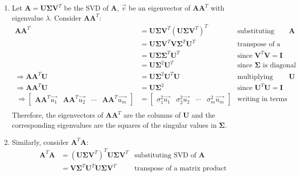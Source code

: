 \documentclass[11pt, fleqn]{article}
\begin{document}
\begin{enumerate}
    \item Let $\textbf{A} = \textbf{U} \boldsymbol{\Sigma} \textbf{V}^T$ be the SVD of $\textbf{A}$, $\vec{v}$ be an eigenvector of $\textbf{A} \textbf{A}^T$ with eigenvalue $\lambda$.
    Consider $\textbf{A} \textbf{A}^T$:
    \begin{align*}
        \textbf{A} \textbf{A}^T &= \textbf{U} \boldsymbol{\Sigma} \textbf{V}^T (\textbf{U} \boldsymbol{\Sigma} \textbf{V}^T)^T & \text{substituting SVD of } \textbf{A} \\
        &= \textbf{U} \boldsymbol{\Sigma} \textbf{V}^T \textbf{V} \boldsymbol{\Sigma}^T \textbf{U}^T & \text{transpose of a matrix product} \\
        &= \textbf{U} \boldsymbol{\Sigma} \boldsymbol{\Sigma}^T \textbf{U}^T & \text{since } \textbf{V}^T \textbf{V} = \textbf{I} \\
        &= \textbf{U} \boldsymbol{\Sigma}^2 \textbf{U}^T & \text{since } \boldsymbol{\Sigma} \text{ is diagonal} \\
        \Rightarrow \textbf{AA}^T \textbf{U} &= \textbf{U} \boldsymbol{\Sigma}^2 \textbf{U}^T \textbf{U} & \text{multiplying both sides by } \textbf{U} \\
        \Rightarrow \textbf{AA}^T \textbf{U} &= \textbf{U} \boldsymbol{\Sigma}^2 & \text{since } \textbf{U}^T \textbf{U} = \textbf{I} \\\
        \Rightarrow \begin{bmatrix}
            \textbf{AA}^T \vec{u_1} & \textbf{AA}^T \vec{u_2} & \cdots & \textbf{AA}^T \vec{u_m}
        \end{bmatrix} &= \begin{bmatrix}
            \sigma_1^2 \vec{u_1} & \sigma_2^2 \vec{u_2} & \cdots & \sigma_m^2 \vec{u_m}
        \end{bmatrix} & \text{writing in terms of columns} \\
    \end{align*}
    Therefore, the eigenvectors of $\textbf{A} \textbf{A}^T$ are the columns of $\textbf{U}$ and the corresponding eigenvalues are the squares of the singular values in $\boldsymbol{\Sigma}$.
    \item Similarly, consider $\textbf{A}^T \textbf{A}$:
    \begin{align*}
        \textbf{A}^T \textbf{A} &= (\textbf{U} \boldsymbol{\Sigma} \textbf{V}^T)^T \textbf{U} \boldsymbol{\Sigma} \textbf{V}^T & \text{substituting SVD of } \textbf{A} \\
        &= \textbf{V} \boldsymbol{\Sigma}^T \textbf{U}^T \textbf{U} \boldsymbol{\Sigma} \textbf{V}^T & \text{transpose of a matrix product} \\

\end{align*}
\end{enumerate}
\end{document}
